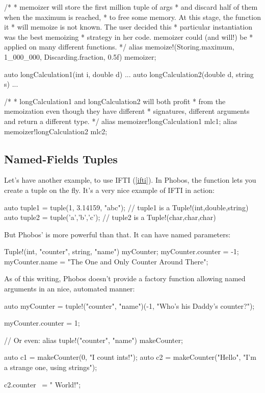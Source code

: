 \begin{dcode}
/*
 * memoizer will store the first million tuple of args
 * and discard half of them when the maximum is reached, 
 * to free some memory. At this stage, the function it 
 * will memoize is not known. The user decided this
 * particular instantiation was the best memoizing 
 * strategy in her code. memoizer could (and will!) be 
 * applied on many different functions.
 */
alias memoize!(Storing.maximum, 1_000_000, Discarding.fraction, 0.5f) memoizer;

auto longCalculation1(int i, double d) { ... }
auto longCalculation2(double d, string s) { ... }

/*
 * longCalculation1 and longCalculation2 will both profit 
 * from the memoization even though they have different 
 * signatures, different arguments and return a different type.
 */
alias memoizer!longCalculation1 mlc1;
alias memoizer!longCalculation2 mlc2;
\end{dcode}


\subsection{Named-Fields Tuples}\label{namedfieldstuples}

Let's have another example, to use IFTI (\ref{ifti}). In Phobos, the function  lets you create a tuple on the fly. It's a very nice example of IFTI in action:

\begin{dcode}
auto tuple1 = tuple(1, 3.14159, "abc"); // tuple1 is a Tuple!(int,double,string)
auto tuple2 = tuple('a','b','c'); // tuple2 is a Tuple!(char,char,char)
\end{dcode}

But Phobos'  is more powerful than that. It can have named parameters:

\begin{dcode}
Tuple!(int, "counter", string, "name") myCounter;
myCounter.counter = -1;
myCounter.name = "The One and Only Counter Around There";
\end{dcode}

As of this writing, Phobos doesn't provide a  factory function allowing named arguments in an nice, automated manner:

\begin{dcode}
auto myCounter = tuple!("counter", "name")(-1, "Who's his Daddy's counter?");

myCounter.counter = 1;

// Or even:
alias tuple!("counter", "name") makeCounter;

auto c1 = makeCounter(0, "I count ints!");
auto c2 = makeCounter("Hello", "I'm a strange one, using strings");

c2.counter ~= " World!";
\end{dcode}

